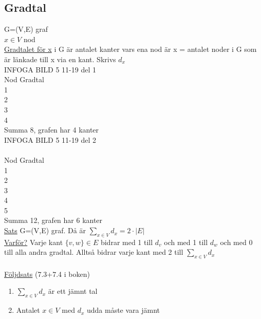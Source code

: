 \documentclass{article}
\begin{document}
    \subsection{Gradtal}
        G=(V,E) graf\\
        $x\in V$ nod\\
        \underline{Gradtalet för x} i G är antalet kanter vars ena nod är x = antalet noder i G som är länkade till x via en kant. Skrivs $d_{x}$\\
        INFOGA BILD 5 11-19 del 1\\
        Nod Gradtal\\
        1 \indent {}\\
        2 \indent {}\\
        3 \indent {}\\
        4 \indent {}\\
        Summa 8, grafen har 4 kanter\\
        INFOGA BILD 5 11-19 del 2\\\\
        Nod Gradtal\\
        1 \indent {}\\
        2 \indent {}\\
        3 \indent {}\\
        4 \indent {}\\
        5 \indent {}\\
        Summa 12, grafen har 6 kanter\\
        \underline{Sats} G=(V,E) graf. Då är $\sum_{x\in V}d_{x}=2\cdot|E|$\\
        \underline{Varför?} Varje kant $\{v,w\}\in E$ bidrar med 1 till $d_{v}$ och med 1 till $d_{w}$ och med 0 till alla andra gradtal.
        Alltså bidrar varje kant med 2 till $\sum_{x\in V}d_{x}$\\\\
        \underline{Följdsats} (7.3+7.4 i boken)
        \begin{enumerate}
            \item $\sum_{x\in V}d_{x}$ är ett jämnt tal
            \item Antalet $x\in V$ med $d_{x}$ udda måste vara jämnt
        \end{enumerate}
\end{document}
